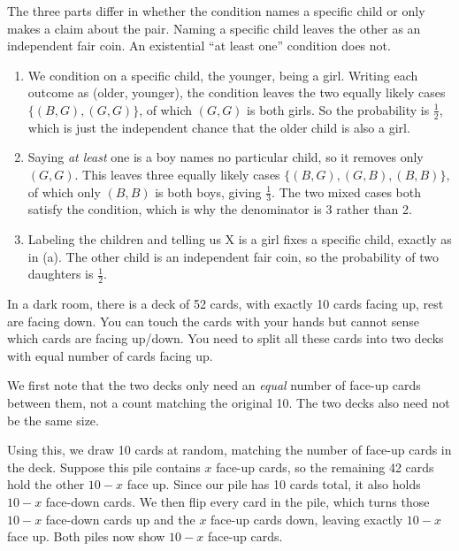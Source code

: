\begin{solution}
The three parts differ in whether the condition names a specific child or only makes a claim about the pair. Naming a specific child leaves the other as an independent fair coin. An existential ``at least one'' condition does not.

\begin{enumerate}[label={\alph*.}]
    \item We condition on a specific child, the younger, being a girl. Writing each outcome as (older, younger), the condition leaves the two equally likely cases $\{(B,G), (G,G)\}$, of which $(G,G)$ is both girls. So the probability is $\frac{1}{2}$, which is just the independent chance that the older child is also a girl.
    \item Saying \textit{at least} one is a boy names no particular child, so it removes only $(G,G)$. This leaves three equally likely cases $\{(B,G), (G,B), (B,B)\}$, of which only $(B,B)$ is both boys, giving $\frac{1}{3}$. The two mixed cases both satisfy the condition, which is why the denominator is 3 rather than 2.
    \item Labeling the children and telling us X is a girl fixes a specific child, exactly as in (a). The other child is an independent fair coin, so the probability of two daughters is $\frac{1}{2}$.
\end{enumerate}
\end{solution}

\begin{problem}
In a dark room, there is a deck of 52 cards, with exactly 10 cards facing up, rest are facing down. You can touch the cards with your hands but cannot sense which cards are facing up/down. You need to split all these cards into two decks with equal number of cards facing up.
\end{problem}

\begin{solution}
We first note that the two decks only need an \textit{equal} number of face-up cards between them, not a count matching the original 10. The two decks also need not be the same size.

Using this, we draw 10 cards at random, matching the number of face-up cards in the deck. Suppose this pile contains $x$ face-up cards, so the remaining 42 cards hold the other $10 - x$ face up. Since our pile has 10 cards total, it also holds $10 - x$ face-down cards. We then flip every card in the pile, which turns those $10 - x$ face-down cards up and the $x$ face-up cards down, leaving exactly $10 - x$ face up. Both piles now show $10 - x$ face-up cards.
\end{solution}


